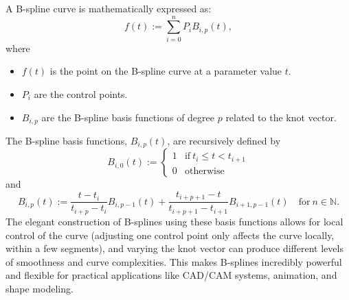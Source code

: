 A B-spline curve is mathematically expressed as:
\begin{equation}
f(t):=\sum_{i=0}^{n}P_{i}B_{i,p}(t),\nonumber
\end{equation}
where
\begin{itemize}
\item $f(t)$ is the point on the B-spline curve at a parameter value $t$.
\item $P_{i}$ are the control points.
\item $B_{i,p}$ are the B-spline basis functions of degree $p$ related to the knot vector.
\end{itemize}
The B-spline basis functions, $B_{i,p}(t)$, are recursively defined by
\begin{equation}
B_{i,0}(t):=
\begin{cases}
1 & \text{if}\ t_{i}\leq{}t < t_{i+1} \\
0 & \text{otherwise}
\end{cases}\nonumber
\end{equation}
and
\begin{equation}
B_{i,p}(t):=\frac{t-t_{i}}{t_{i+p}-t_{i}}B_{i,p-1}(t)+\frac{t_{i+p+1}-t}{t_{i+p+1}-t_{i+1}}B_{i+1,p-1}(t)\quad\text{for}\ n\in\mathbb{N}.\nonumber
\end{equation}
The elegant construction of B-splines using these basis functions allows for local control of the curve
(adjusting one control point only affects the curve locally, within a few segments),
and varying the knot vector can produce different levels of smoothness and curve complexities.
This makes B-splines incredibly powerful and flexible for practical applications like CAD/CAM systems,
animation, and shape modeling. 